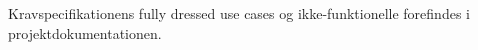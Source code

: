 Kravspecifikationens fully dressed use cases og ikke-funktionelle forefindes i projektdokumentationen.

%
%
%
%
